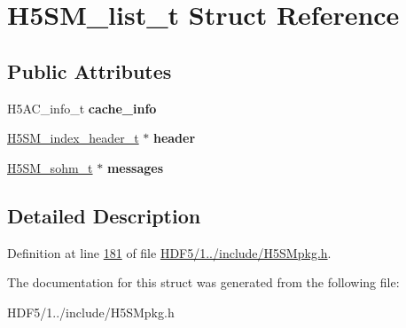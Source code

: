 \hypertarget{struct_h5_s_m__list__t}{}\section{H5\+S\+M\+\_\+list\+\_\+t Struct Reference}
\label{struct_h5_s_m__list__t}
\subsection*{Public Attributes}
\begin{DoxyCompactItemize}
\item 
\mbox{\label{struct_h5_s_m__list__t_a2226484bd0dcd7ef126e9b13fc82f35c}} 
H5\+A\+C\+\_\+info\+\_\+t {\bfseries cache\+\_\+info}
\item 
\mbox{\label{struct_h5_s_m__list__t_af3b7f2f191ebf76cce3e8b8a8b7faa3d}} 
\hyperlink{struct_h5_s_m__index__header__t}{H5\+S\+M\+\_\+index\+\_\+header\+\_\+t} $\ast$ {\bfseries header}
\item 
\mbox{\label{struct_h5_s_m__list__t_a7510f1b1de899e01311cc2a28d96eadf}} 
\hyperlink{struct_h5_s_m__sohm__t}{H5\+S\+M\+\_\+sohm\+\_\+t} $\ast$ {\bfseries messages}
\end{DoxyCompactItemize}


\subsection{Detailed Description}


Definition at line \hyperlink{_h_d_f5_21_810_81_2include_2_h5_s_mpkg_8h_source_l00181}{181} of file \hyperlink{_h_d_f5_21_810_81_2include_2_h5_s_mpkg_8h_source}{H\+D\+F5/1../include/\+H5\+S\+Mpkg.\+h}.



The documentation for this struct was generated from the following file\+:\begin{DoxyCompactItemize}
\item 
H\+D\+F5/1../include/\+H5\+S\+Mpkg.\+h\end{DoxyCompactItemize}
